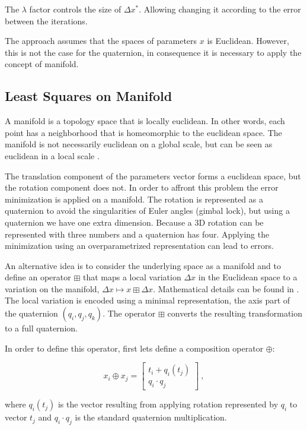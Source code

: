 \noindent The $\lambda$ factor controls the size of $ \Delta x^*$. Allowing changing it according to the error between the iterations.
 
The approach assumes that the spaces of parameters $x$ is Euclidean. However, this is not the case for the quaternion, 
in consequence it is necessary to apply the concept of manifold.


\subsection{Least Squares on Manifold}

A manifold is a topology space that is locally euclidean. In other words, each point has a neighborhood that is 
homeomorphic to the euclidean space. The manifold is not necessarily euclidean on a global scale, but can be seen 
as euclidean in a local scale \cite{manifold}.

The translation component of the parameters vector forms a euclidean space, but the rotation component does not.
In order to affront this problem the error minimization is applied on a manifold. The rotation is represented as a 
quaternion to avoid the singularities of Euler angles (gimbal lock), but using a quaternion we have one extra 
dimension. Because a 3D rotation can be represented with three numbers and a quaternion has four. Applying the 
minimization using an overparametrized representation can lead to errors.

An alternative idea is to consider the underlying space as a manifold
and to define an operator $\boxplus$ that maps a local variation
$\Delta x$ in the Euclidean space to a variation on the manifold, $\Delta x \mapsto x \boxplus \Delta x$. 
Mathematical details can be found in \cite{hertzberg08}. The local variation is encoded using a minimal 
representation, the axis part of the quaternion $(q_i,q_j,q_k)$. The operator $\boxplus$ converts the 
resulting transformation to a full quaternion.

In order to define this operator, first lets define a composition operator $\oplus$:

$$
x_i \oplus x_j = \begin{bmatrix} t_i + q_i(t_j) \\ q_i \cdot q_j \end{bmatrix} \ ,
$$

\noindent where $q_i(t_j)$ is the vector resulting from applying rotation represented by $q_i$ to vector $t_j$ and 
$q_i \cdot q_j$ is the standard quaternion multiplication.


